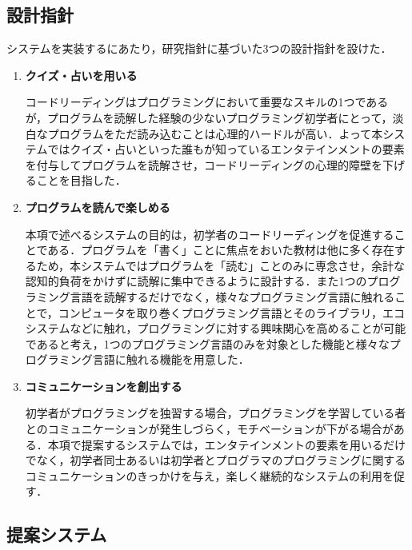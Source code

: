 \subsection{設計指針}
システムを実装するにあたり，研究指針に基づいた3つの設計指針を設けた．
\begin{enumerate}
  \item {\bf クイズ・占いを用いる}

  コードリーディングはプログラミングにおいて重要なスキルの1つであるが，プログラムを読解した経験の少ないプログラミング初学者にとって，淡白なプログラムをただ読み込むことは心理的ハードルが高い．よって本システムではクイズ・占いといった誰もが知っているエンタテインメントの要素を付与してプログラムを読解させ，コードリーディングの心理的障壁を下げることを目指した．


  \item {\bf プログラムを読んで楽しめる}


  本項で述べるシステムの目的は，初学者のコードリーディングを促進することである．プログラムを「書く」ことに焦点をおいた教材は他に多く存在するため，本システムではプログラムを「読む」ことのみに専念させ，余計な認知的負荷をかけずに読解に集中できるように設計する．また1つのプログラミング言語を読解するだけでなく，様々なプログラミング言語に触れることで，コンピュータを取り巻くプログラミング言語とそのライブラリ，エコシステムなどに触れ，プログラミングに対する興味関心を高めることが可能であると考え，1つのプログラミング言語のみを対象とした機能と様々なプログラミング言語に触れる機能を用意した．


  \item {\bf コミュニケーションを創出する}
  
  初学者がプログラミングを独習する場合，プログラミングを学習している者とのコミュニケーションが発生しづらく，モチベーションが下がる場合がある．本項で提案するシステムでは，エンタテインメントの要素を用いるだけでなく，初学者同士あるいは初学者とプログラマのプログラミングに関するコミュニケーションのきっかけを与え，楽しく継続的なシステムの利用を促す．
\end{enumerate}

\subsection{提案システム}
